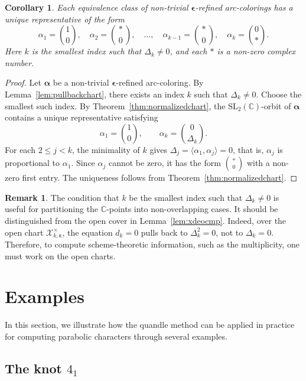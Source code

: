 \documentclass[12pt,reqno]{amsart}
\newcommand{\BC}{\mathbb{C}}
\newcommand{\calX}{\mathcal{X}}
\newcommand{\SL}{\mathrm{SL}}
\newtheorem{corollary}[theorem]{Corollary}
\theoremstyle{definition}
\newtheorem{remark}[theorem]{Remark}
\begin{document}
	\begin{corollary} \label{cor:normalizedrep}
		Each equivalence class of non-trivial $\boldsymbol{\epsilon}$-refined arc-colorings has a unique representative of the form
		$$
		\alpha_{1} = \binom{1}{0}, \quad \alpha_{2} = \binom{\ast}{0},	\quad
		\ldots,	\quad \alpha_{{k-1}} =\binom{\ast}{0}, \quad\alpha_{k} =\binom{0}{\ast}.
		$$
		Here $k$ is the smallest index such that $\Delta_k\neq 0$, and each $\ast$ is a non-zero complex number.
	\end{corollary}
	
	\begin{proof}
		Let $\boldsymbol{\alpha}$ be a non-trivial $\boldsymbol{\epsilon}$-refined arc-coloring. 
        By Lemma~\ref{lem:pullbackchart}, there exists an index $k$ such that $\Delta_k\neq 0$. 
        Choose the smallest such index. By Theorem~\ref{thm:normalizedchart}, the $\SL_2(\BC)$-orbit of $\boldsymbol{\alpha}$ contains a unique	representative satisfying
		$$
		\alpha_{1} 	=\binom{1}{0}, \qquad \alpha_{k} = \binom{0}{\Delta_k}.
		$$
		For each $2 \leq j<k$, the minimality of $k$ gives
        $\Delta_j =	\langle\alpha_{1},\alpha_{j}\rangle	= 0$, that is, $\alpha_{j}$ is proportional to $\alpha_{1}$.
		Since $\alpha_{j}$ cannot be zero, it has the form $\binom{\ast}{0}$ with a non-zero first entry. 
        The uniqueness follows from Theorem~\ref{thm:normalizedchart}. 
	\end{proof}

    \begin{remark}
		The condition that $k$ be the smallest index such that $\Delta_k\neq 0$ is useful for partitioning the $\BC$-points into non-overlapping cases. It should be distinguished from the open cover in Lemma~\ref{lem:xdeocmp}.
		Indeed, over the open chart $\calX^\times_{k,\boldsymbol{\epsilon}}$, the equation $d_k=0$ pulls back to	$\Delta_k^2=0$, not to $\Delta_k=0$. Therefore, to compute scheme-theoretic information, such as the multiplicity, one must work on the open charts.
    \end{remark}
	
	\section{Examples}\label{sec.example}
	
	In this section, we illustrate how the quandle method can be applied in practice for computing parabolic characters through several examples.
	
	\subsection{The knot $4_1$}\label{sec:4_1}
	
\end{document}
